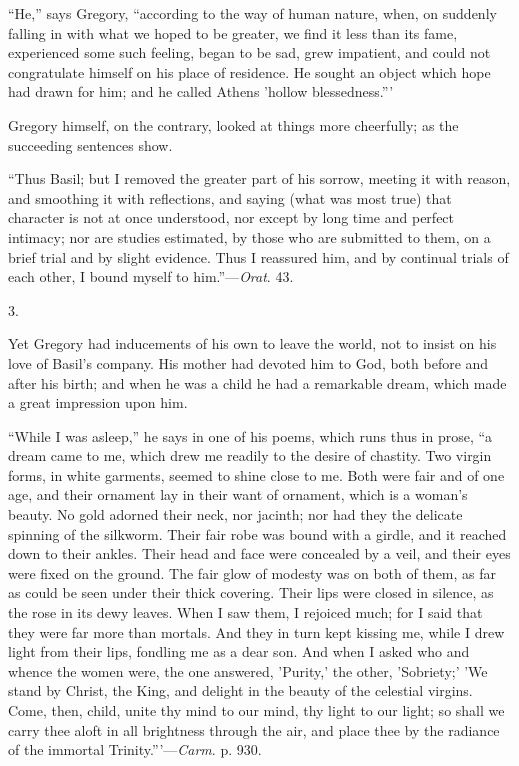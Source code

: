 ``He,'' says Gregory, ``according to the way of human
nature, when, on suddenly falling in with what we hoped to be greater,
we find it less than its fame, experienced some such feeling, began to
be sad, grew impatient, and could not congratulate himself on his
place of residence. He sought an object which hope had drawn for him;
and he called Athens 'hollow blessedness.'''

Gregory himself, on the contrary, looked at things more cheerfully;
as the succeeding sentences show.

``Thus Basil; but I removed the greater part of his sorrow,
meeting it with reason, and smoothing it with reflections, and saying
(what was most true) that character is not at once understood, nor
except by long time and perfect intimacy; nor are studies estimated,
by those who are submitted to them, on a brief trial and by slight
evidence. Thus I reassured him, and by continual trials of each other,
I bound myself to him.''—\emph{Orat}. 43.

3.

Yet Gregory had inducements of his own to leave the world, not to
insist on his love of Basil's company. His mother had devoted him to
God, both before and after his birth; and when he was a child he had a
remarkable dream, which made a great impression upon him.

``While I was asleep,'' he says in one of his poems, which
runs thus in prose, ``a dream came to me, which drew me readily to
the desire of chastity. Two virgin forms,
in white garments, seemed to shine close to me. Both were fair and of
one age, and their ornament lay in their want of ornament, which is a
woman's beauty. No gold adorned their neck, nor jacinth; nor had they
the delicate spinning of the silkworm. Their fair robe was bound with
a girdle, and it reached down to their ankles. Their head and face
were concealed by a veil, and their eyes were fixed on the ground. The
fair glow of modesty was on both of them, as far as could be seen
under their thick covering. Their lips were closed in silence, as the
rose in its dewy leaves. When I saw them, I rejoiced much; for I said
that they were far more than mortals. And they in turn kept kissing
me, while I drew light from their lips, fondling me as a dear son. And
when I asked who and whence the women were, the one answered,
'Purity,' the other, 'Sobriety;' 'We stand by Christ, the King, and
delight in the beauty of the celestial virgins. Come, then, child,
unite thy mind to our mind, thy light to our light; so shall we carry
thee aloft in all brightness through the air, and place thee by the
radiance of the immortal Trinity.'''—\emph{Carm}. p. 930.

